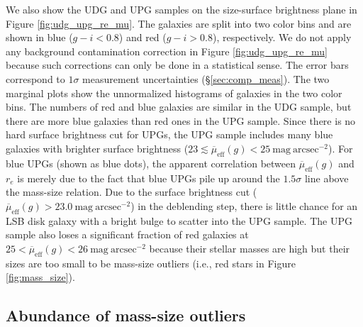 \documentclass[twocolumn,astrosymb,twocolappendix]{aastex631}
\newcommand{\sbunit}{\mathrm{mag\ arcsec}^{-2}}
\newcommand{\sbeff}{\overline{\mu}_{\mathrm{eff}}(g)}
\begin{document}
\begin{CJK*}{UTF8}{gbsn}
We also show the UDG and UPG samples on the size-surface brightness plane in Figure \ref{fig:udg_upg_re_mu}. The galaxies are split into two color bins and are shown in blue ($g-i < 0.8$) and red ($g-i > 0.8$), respectively. We do not apply any background contamination correction in Figure \ref{fig:udg_upg_re_mu} because such corrections can only be done in a statistical sense. The error bars correspond to $1\sigma$ measurement uncertainties (\S\ref{sec:comp_meas}). The two marginal plots show the unnormalized histograms of galaxies in the two color bins. The numbers of red and blue galaxies are similar in the UDG sample, but there are more blue galaxies than red ones in the UPG sample. Since there is no hard surface brightness cut for UPGs, the UPG sample includes many blue galaxies with brighter surface brightness ($23 \lesssim \sbeff < 25\ \sbunit$). For blue UPGs (shown as blue dots), the apparent correlation between $\sbeff$ and $r_e$ is merely due to the fact that blue UPGs pile up around the $1.5\sigma$ line above the mass-size relation. Due to the surface brightness cut ($\sbeff > 23.0\ \sbunit$) in the deblending step, there is little chance for an LSB disk galaxy with a bright bulge to scatter into the UPG sample. The UPG sample also loses a significant fraction of red galaxies at $25 < \sbeff < 26\ \sbunit$ because their stellar masses are high but their sizes are too small to be mass-size outliers (i.e., red stars in Figure \ref{fig:mass_size}). 


\subsection{Abundance of mass-size outliers}\label{sec:n_udg}


\end{CJK*}
\end{document}
